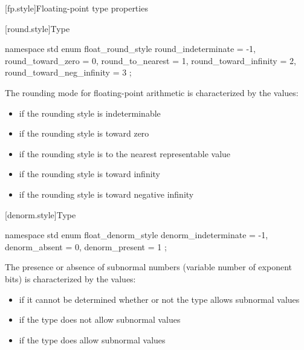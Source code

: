 [fp.style]{Floating-point type properties}

[round.style]{Type }

%
\begin{codeblock}
namespace std {
  enum float_round_style {
    round_indeterminate       = -1,
    round_toward_zero         =  0,
    round_to_nearest          =  1,
    round_toward_infinity     =  2,
    round_toward_neg_infinity =  3
  };
}
\end{codeblock}

\pnum
The rounding mode for floating-point arithmetic is characterized by the
values:

\begin{itemize}
\item
{}
if the rounding style is indeterminable
\item
{}
if the rounding style is toward zero
\item
{}
if the rounding style is to the nearest representable value
\item
{}
if the rounding style is toward infinity
\item
{}
if the rounding style is toward negative infinity
\end{itemize}

[denorm.style]{Type }

%
\begin{codeblock}
namespace std {
  enum float_denorm_style {
    denorm_indeterminate = -1,
    denorm_absent = 0,
    denorm_present = 1
  };
}
\end{codeblock}

%
%
%
%
\pnum
The presence or absence of subnormal numbers (variable number of exponent bits)
is characterized by the values:

\begin{itemize}
\item
{}%
if it cannot be determined whether or not the type allows subnormal values
\item
{}%
if the type does not allow subnormal values
\item
{}%
if the type does allow subnormal values
\end{itemize}

